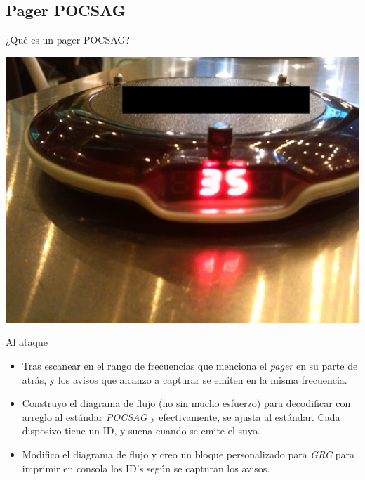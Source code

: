 \documentclass{beamer}
\begin{document}
\subsection{Pager POCSAG}

\begin{frame}{¿Qué es un pager POCSAG?}

\begin{center}
\includegraphics[scale=0.08]{pagerfront.jpg}
\end{center}

\end{frame}

\begin{frame}{Al ataque}

\begin{itemize}
	\item Tras escanear en el rango de frecuencias que menciona el \emph{pager} en su parte de atrás, y los avisos que alcanzo a capturar se emiten en la misma frecuencia.
	\item Construyo el diagrama de flujo (no sin mucho esfuerzo) para decodificar con arreglo al estándar \emph{POCSAG} y efectivamente, se ajusta al estándar. Cada disposivo tiene un ID, y suena cuando se emite el suyo.
	\item Modifico el diagrama de flujo y creo un bloque personalizado para \emph{GRC} para imprimir en consola los ID's según se capturan los avisos.
\end{itemize}

\end{frame}
\end{document}

